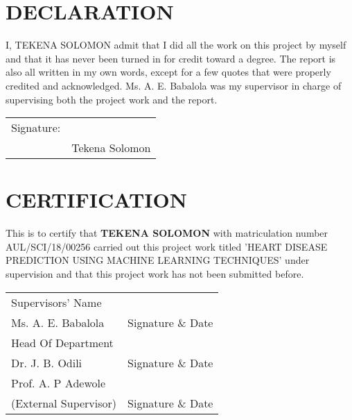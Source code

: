 \documentclass[12pt,paper=a4,oneside,cleardoubleage=plain,final]{report}
\begin{document}

\doublespacing

\clearpage
\setcounter{page}{2}

\chapter*{DECLARATION}
\noindent
I, TEKENA SOLOMON admit that I did all the work on this project by myself and that it has never been turned in for credit toward a degree. The report is also all written in my own words, except for a few quotes that were properly credited and acknowledged. Ms. A. E. Babalola was my supervisor in charge of supervising both the project work and the report.

\vspace{10mm}
\begin{tabular}{@{}p{.5in}p{2in}@{}}
	Signature: & \hrulefill \\
	& Tekena Solomon \\
\end{tabular}

\chapter*{CERTIFICATION}
\noindent
\normalsize This is to certify that \textbf{TEKENA SOLOMON} with matriculation number AUL/SCI/18/00256 carried out this project work titled 'HEART DISEASE PREDICTION USING MACHINE LEARNING TECHNIQUES' under supervision and that this project work has not been submitted before. \\[1.0cm]

\vspace{0.8cm}


\noindent
\begin{tabular}{@{}p{}p{}@{}}
	Supervisors' Name & \\[0.2cm]
	Ms. A. E. Babalola & Signature \& Date\dotfill \\[1cm]
	Head Of Department & \\[0.2cm]
	Dr.  J. B. Odili & Signature \& Date\dotfill \\[1cm]
	Prof. A. P Adewole & \\[0.2cm]
	(External Supervisor) & Signature \& Date\dotfill \\
\end{tabular}

\vfill
\end{document}
